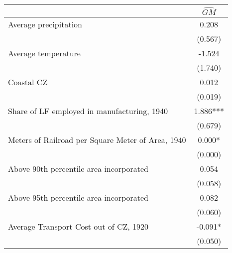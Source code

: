  \begin{tabular}{l*{1}{c}} \toprule
                &\multicolumn{1}{c}{$\widehat{GM}$}\\
\midrule
Average precipitation&    0.208   \\
                &  (0.567)   \\
\addlinespace
Average temperature&   -1.524   \\
                &  (1.740)   \\
\addlinespace
Coastal CZ      &    0.012   \\
                &  (0.019)   \\
\addlinespace
Share of LF employed in manufacturing, 1940&    1.886***\\
                &  (0.679)   \\
\addlinespace
Meters of Railroad per Square Meter of Area, 1940&    0.000*  \\
                &  (0.000)   \\
\addlinespace
Above 90th percentile area incorporated&    0.054   \\
                &  (0.058)   \\
\addlinespace
Above 95th percentile area incorporated&    0.082   \\
                &  (0.060)   \\
\addlinespace
Average Transport Cost out of CZ, 1920&   -0.091*  \\
                &  (0.050)   \\
 \bottomrule \end{tabular}

